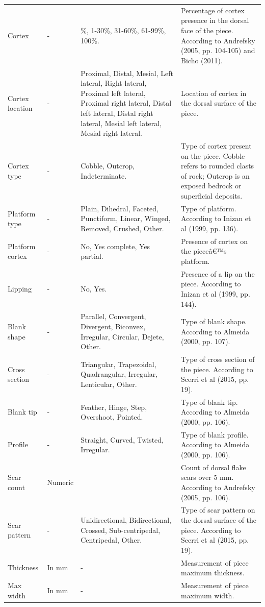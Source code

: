 \documentclass[12pt,twoside]{reedthesis}
\begin{document}
\begin{landscape}
\begin{longtable}[t]{>{\raggedright\arraybackslash}p{2cm}>{\raggedright\arraybackslash}p{3cm}>{\raggedright\arraybackslash}p{6cm}>{\raggedright\arraybackslash}p{9cm}}
Cortex & - & 0\%, 1-30\%, 31-60\%, 61-99\%, 100\%. & Percentage of cortex presence in the dorsal face of the piece. According to Andrefsky (2005, pp. 104-105) and Bicho (2011).\\
Cortex location & - & Proximal, Distal, Mesial, Left lateral, Right lateral, Proximal left lateral, Proximal right lateral, Distal left lateral, Distal right lateral, Mesial left lateral, Mesial right lateral. & Location of cortex in the dorsal surface of the piece.\\
Cortex type & - & Cobble, Outcrop, Indeterminate. & Type of cortex present on the piece. Cobble refers to rounded clasts of rock; Outcrop is an exposed bedrock or superficial deposits.\\
\addlinespace
Platform type & - & Plain, Dihedral, Faceted, Punctiform, Linear, Winged, Removed, Crushed, Other. & Type of platform. According to Inizan et al (1999, pp. 136).\\
Platform cortex & - & No, Yes complete, Yes partial. & Presence of cortex on the pieceâ€™s platform.\\
Lipping & - & No, Yes. & Presence of a lip on the piece. According to Inizan et al (1999, pp. 144).\\
Blank shape & - & Parallel, Convergent, Divergent, Biconvex, Irregular, Circular, Dejete, Other. & Type of blank shape. According to Almeida (2000, pp. 107).\\
Cross section & - & Triangular, Trapezoidal, Quadrangular, Irregular, Lenticular, Other. & Type of cross section of the piece. According to Scerri et al (2015, pp. 19).\\
\addlinespace
Blank tip & - & Feather, Hinge, Step, Overshoot, Pointed. & Type of blank tip. According to Almeida (2000, pp. 106).\\
Profile & - & Straight, Curved, Twisted, Irregular. & Type of blank profile. According to Almeida (2000, pp. 106).\\
Scar count & Numeric &  & Count of dorsal flake scars over 5 mm. According to Andrefsky (2005, pp. 106).\\
Scar pattern & - & Unidirectional, Bidirectional, Crossed, Sub-centripedal, Centripedal, Other. & Type of scar pattern on the dorsal surface of the piece. According to Scerri et al (2015, pp. 19).\\
Thickness & In mm & - & Measurement of piece maximum thickness.\\
\addlinespace
Max width & In mm & - & Measurement of piece maximum width.\\

\end{longtable}
\end{landscape}
\end{document}
